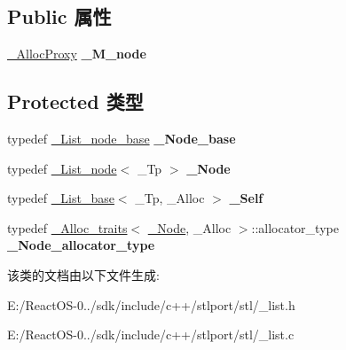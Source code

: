 \subsection*{Public 属性}
\begin{DoxyCompactItemize}
\item 
\mbox{\label{class___list__base_a6b3ca740d546c20dbacd3d87193d070b}} 
\hyperlink{class___s_t_l_p__alloc__proxy}{\+\_\+\+Alloc\+Proxy} {\bfseries \+\_\+\+M\+\_\+node}
\end{DoxyCompactItemize}
\subsection*{Protected 类型}
\begin{DoxyCompactItemize}
\item 
\mbox{\label{class___list__base_a8f1c832b90cdf15296c943e2b32ee175}} 
typedef \hyperlink{struct___list__node__base}{\+\_\+\+List\+\_\+node\+\_\+base} {\bfseries \+\_\+\+Node\+\_\+base}
\item 
\mbox{\label{class___list__base_a3e238c8cb74804a6011c67eae966fd68}} 
typedef \hyperlink{class___list__node}{\+\_\+\+List\+\_\+node}$<$ \+\_\+\+Tp $>$ {\bfseries \+\_\+\+Node}
\item 
\mbox{\label{class___list__base_aaa1eeaf2b23766aa1a58ad35cf39bf69}} 
typedef \hyperlink{class___list__base}{\+\_\+\+List\+\_\+base}$<$ \+\_\+\+Tp, \+\_\+\+Alloc $>$ {\bfseries \+\_\+\+Self}
\item 
\mbox{\label{class___list__base_a9b7f82fd2413c70fa1f08dacc547174b}} 
typedef \hyperlink{struct___alloc__traits}{\+\_\+\+Alloc\+\_\+traits}$<$ \hyperlink{class___list__node}{\+\_\+\+Node}, \+\_\+\+Alloc $>$\+::allocator\+\_\+type {\bfseries \+\_\+\+Node\+\_\+allocator\+\_\+type}
\end{DoxyCompactItemize}


该类的文档由以下文件生成\+:\begin{DoxyCompactItemize}
\item 
E\+:/\+React\+O\+S-\/0../sdk/include/c++/stlport/stl/\+\_\+list.\+h\item 
E\+:/\+React\+O\+S-\/0../sdk/include/c++/stlport/stl/\+\_\+list.\+c\end{DoxyCompactItemize}
